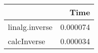 \begin{tabular}{lr}
\toprule
{} &      Time \\
\midrule
linalg.inverse &  0.000074 \\
calcInverse    &  0.000034 \\
\bottomrule
\end{tabular}
